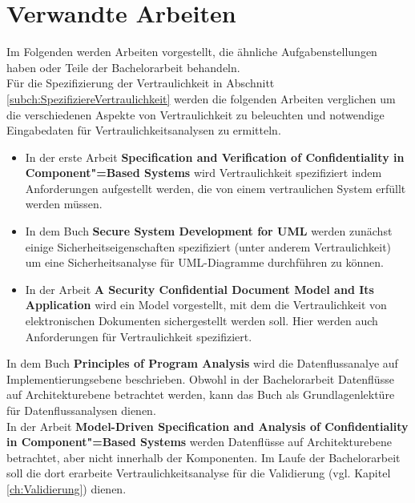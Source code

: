 
\chapter{Verwandte Arbeiten}
\label{ch:VerwandteArbeiten}
Im Folgenden werden Arbeiten vorgestellt, die ähnliche Aufgabenstellungen haben oder Teile der Bachelorarbeit behandeln. \\

Für die Spezifizierung der Vertraulichkeit in Abschnitt \ref{subch:SpezifiziereVertraulichkeit} werden die folgenden Arbeiten verglichen um die verschiedenen Aspekte von Vertraulichkeit zu beleuchten und notwendige Eingabedaten für Vertraulichkeitsanalysen zu ermitteln.
\begin{itemize}
\item In der erste Arbeit \textbf{Specification and Verification of
Confidentiality in Component"=Based Systems} \cite{Kramer} wird Vertraulichkeit spezifiziert indem Anforderungen aufgestellt werden, die von einem vertraulichen System erfüllt werden müssen.
\item In dem Buch \textbf{Secure System Development for UML} \cite{Jurjens2005} werden zunächst einige Sicherheitseigenschaften spezifiziert (unter anderem Vertraulichkeit) um eine Sicherheitsanalyse für UML-Diagramme durchführen zu können.
\item In der Arbeit \textbf{A Security Confidential Document Model and Its Application} \cite{Zheng2010} wird ein Model vorgestellt, mit dem die Vertraulichkeit von elektronischen Dokumenten sichergestellt werden soll. Hier werden auch Anforderungen für Vertraulichkeit spezifiziert.
\end{itemize}

In dem Buch \textbf{Principles of Program Analysis} \cite{Nielson1999} wird die Datenflussanalye auf Implementierungsebene beschrieben. Obwohl in der Bachelorarbeit Datenflüsse auf Architekturebene betrachtet werden, kann das Buch als Grundlagenlektüre für Datenflussanalysen dienen. \\
In der Arbeit \textbf{Model-Driven Specification and Analysis of Confidentiality in Component"=Based Systems} \cite{Kramera} werden Datenflüsse auf Architekturebene betrachtet, aber nicht innerhalb der Komponenten. Im Laufe der Bachelorarbeit soll die dort erarbeite Vertraulichkeitsanalyse für die Validierung (vgl. Kapitel \ref{ch:Validierung}) dienen. \\

